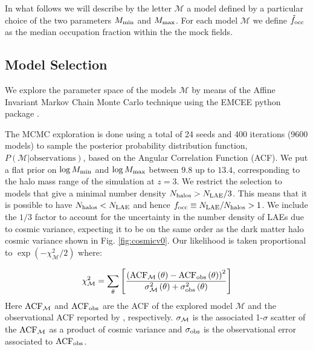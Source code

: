 \documentclass{emulateapj}
\newcommand{\mmax}{{\ifmmode{{M_{\rm max}}}\else{${M_{\rm max}}$}\fi}}
\newcommand{\focc}{{\ifmmode{{f_{\rm occ}}}\else{${f_{\rm occ}}$}\fi}}
\begin{document}
In what follows we will describe by the letter ${\mathcal M}$  a model
defined by a particular choice of the two parameters $M_{\rm min}$ and
$M_{\rm  max}$. For each model  ${\mathcal M}$ we define
$\tilde{f}_{\rm occ}$ as the median occupation fraction within the the
mock fields.

\subsection{Model Selection}
\label{subsec:explore}



We  explore the parameter space of the models
${\mathcal M}$ by  means of the Affine Invariant  Markov Chain Monte Carlo technique using
the EMCEE python package \citep[][and references therein]{emcee2013}. 


The MCMC exploration is done using a total of 24 seeds and 400
iterations (9600 models) to sample the posterior  probability distribution function, $P(\mathcal{M}|\mathrm{observations})$, based on the Angular
Correlation Function (ACF). We put a flat prior on $\log M_{\rm min}$ and $\log \mmax$ between
$9.8$ up to $13.4$, corresponding to the halo mass range of
the simulation at $z=3$.
We restrict the selection to models that give a minimal number density
$N_{\rm{halos}}>N_{\rm LAE}/3$.
This means that it is possible to have $N_{\rm{halos}} < N_{\rm LAE}$
and hence $\focc\equiv N_{\rm{LAE}}/N_{\rm{halos}}>1$.
We include the $1/3$ factor to account for the uncertainty in the number
density of LAEs due to cosmic variance, expecting it to be on the
same order as the dark matter halo cosmic variance shown in
Fig. \ref{fig:cosmicv0}.   Our likelihood is taken proportional to
$ \exp(-\chi_{\mathcal  M}^2/2)$  where:

\begin{equation}
\chi_{\mathcal M}^2=
\sum_{\theta}\left[\frac{\left( \rm{ACF}_{\mathcal
      M}\left(\theta\right) - \rm{ACF}_{\rm
      obs}\left(\theta\right)\right)^2}{ \sigma_{\rm \mathcal
      M}^{2}\left(\theta\right) + \sigma_{\rm
      obs}^{2}\left(\theta\right)}\right]
\end{equation}
%
Here  $\rm{ACF}_{\mathcal M}$ and  $\rm{ACF}_{\rm obs}$ are the ACF
of the explored model ${\mathcal M}$ and the observational ACF
reported by \citet{Bielby16}, respectively.
$\sigma_{\rm \mathcal M}$ is the associated 1-$\sigma$ scatter  of the
$\rm{ACF}_{\mathcal M}$ as a product of cosmic variance and
$\sigma_{\rm obs}$ is the observational error associated to
$\rm{ACF}_{\rm obs}$.
\end{document}
